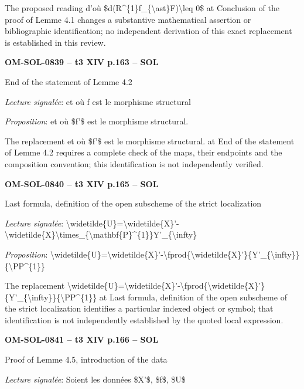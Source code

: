 The proposed reading d'où \$d(R\textasciicircum{}\{1\}f\_\{\textbackslash{}ast\}F)\textbackslash{}leq 0\$ at Conclusion of the proof of Lemme 4.1 changes a substantive mathematical assertion or bibliographic identification; no independent derivation of this exact replacement is established in this review.\par
\par\noindent\textbf{OM-SOL-0839 -- t3 XIV p.163 -- SOL}\par
End of the statement of Lemme 4.2\par
\emph{Lecture signalée}: et où f est le morphisme structural\par
\emph{Proposition}: et où \$f'\$ est le morphisme structural.\par
The replacement et où \$f'\$ est le morphisme structural. at End of the statement of Lemme 4.2 requires a complete check of the maps, their endpoints and the composition convention; this identification is not independently verified.\par
\par\noindent\textbf{OM-SOL-0840 -- t3 XIV p.165 -- SOL}\par
Last formula, definition of the open subscheme of the strict localization\par
\emph{Lecture signalée}: \textbackslash{}widetilde\{U\}=\allowbreak \textbackslash{}widetilde\{X\}'-\textbackslash{}widetilde\{X\}\textbackslash{}times\_\{\textbackslash{}mathbf\{P\}\textasciicircum{}\{1\}\}Y'\_\{\textbackslash{}infty\}\par
\emph{Proposition}: \textbackslash{}widetilde\{U\}=\allowbreak \textbackslash{}widetilde\{X\}'-\textbackslash{}fprod\{\textbackslash{}widetilde\{X\}'\}\{Y'\_\{\textbackslash{}infty\}\}\{\textbackslash{}PP\textasciicircum{}\{1\}\}\par
The replacement \textbackslash{}widetilde\{U\}=\allowbreak \textbackslash{}widetilde\{X\}'-\textbackslash{}fprod\{\textbackslash{}widetilde\{X\}'\}\{Y'\_\{\textbackslash{}infty\}\}\{\textbackslash{}PP\textasciicircum{}\{1\}\} at Last formula, definition of the open subscheme of the strict localization identifies a particular indexed object or symbol; that identification is not independently established by the quoted local expression.\par
\par\noindent\textbf{OM-SOL-0841 -- t3 XIV p.166 -- SOL}\par
Proof of Lemme 4.5, introduction of the data\par
\emph{Lecture signalée}: Soient les données \$X'\$, \$f\$, \$U\$\par
